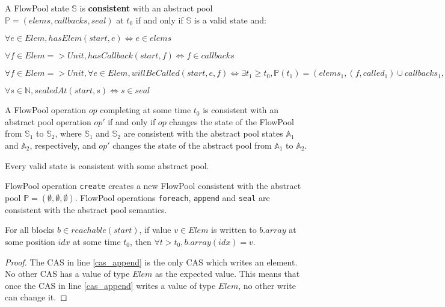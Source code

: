 \documentclass[runningheads,a4paper]{llncs}
\begin{document}
\begin{definition}[Consistency]
A FlowPool state $\mathbb{S}$ is \textbf{consistent} with an abstract pool 
$\mathbb{P} = (elems, callbacks, seal)$ at $t_0$ if and only if $\mathbb{S}$ 
is a valid state and:
\begin{description}
\item $\forall e \in Elem, hasElem(start, e) \Leftrightarrow e \in elems$
\item $\forall f \in Elem => Unit, hasCallback(start, f) \Leftrightarrow f \in callbacks$
\item $\forall f \in Elem => Unit, \forall e \in Elem, willBeCalled(start, e, f) \Leftrightarrow \exists t_1 \geq t_0, \mathbb{P}(t_1) = (elems_1, (f, called_1) \cup callbacks_1, seal_1), elems \subseteq called_1$
\item $\forall s \in \mathbb{N}, sealedAt(start, s) \Leftrightarrow s \in seal$
\end{description}

A FlowPool operation $op$ completing at some time $t_0$ is consistent with an abstract pool operation $op'$ if 
and only if $op$ changes the state of the FlowPool from $\mathbb{S}_1$ to $\mathbb{S}_2$, where $\mathbb{S}_1$ 
and $\mathbb{S}_2$ are consistent with the abstract pool states $\mathbb{A}_1$ and $\mathbb{A}_2$, respectively, 
and $op'$ changes the state of the abstract pool from $\mathbb{A}_1$ to $\mathbb{A}_2$.
\end{definition}


\begin{proposition}
Every valid state is consistent with some abstract pool.
\end{proposition}


\begin{theorem}[Safety]
FlowPool operation \verb=create= creates a new FlowPool consistent with the abstract pool 
$\mathbb{P} = (\emptyset, \emptyset, \emptyset)$. FlowPool operations \verb=foreach=, \verb=append= 
and \verb=seal= are consistent with the abstract pool semantics.
\end{theorem}


\begin{lemma}\label{lemma-end-of-life}
For all blocks $b \in reachable(start)$, if value $v \in Elem$ is
written to $b.array$ at some position $idx$ at some time $t_0$, then
$\forall t > t_0, b.array(idx) = v$.
\end{lemma}

\begin{proof}
The CAS in line \ref{cas_append} is the only CAS which writes an
element.
No other CAS has a value of type $Elem$ as the expected value.
This means that once the CAS in line \ref{cas_append} writes a value
of type $Elem$, no other write can change it.
\end{proof}
\end{document}

